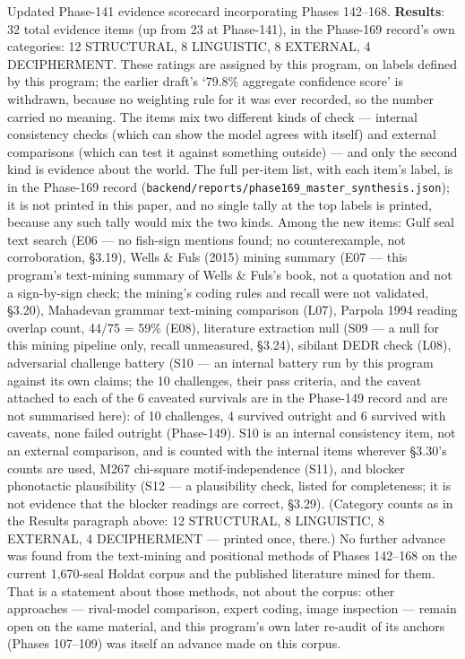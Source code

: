 \documentclass[
]{article}
\newcounter{none} %
\begin{document}
Updated Phase-141 evidence scorecard incorporating Phases 142--168.
\textbf{Results}: 32 total evidence items (up from 23 at Phase-141), in the Phase-169 record's own categories: 12 STRUCTURAL, 8 LINGUISTIC, 8 EXTERNAL, 4 DECIPHERMENT. These ratings are assigned by this program, on labels defined by this program; the earlier draft's `79.8\% aggregate confidence score' is withdrawn, because no weighting rule for it was ever recorded, so the number carried no meaning. The items mix two different kinds of check --- internal consistency checks (which can show the model agrees with itself) and external comparisons (which can test it against something outside) --- and only the second kind is evidence about the world. The full per-item list, with each item's label, is in the Phase-169 record (\texttt{backend/reports/phase169\_master\_synthesis.json}); it is not printed in this paper, and no single tally at the top labels is printed, because any such tally would mix the two kinds. Among the new items: Gulf seal text search (E06 --- no fish-sign mentions found; no counterexample, not corroboration, §3.19), Wells \& Fuls (2015) mining summary (E07 --- this program's text-mining summary of Wells \& Fuls's book, not a quotation and not a sign-by-sign check; the mining's coding rules and recall were not validated, §3.20), Mahadevan grammar text-mining comparison (L07), Parpola 1994 reading overlap count, 44/75 = 59\% (E08), literature extraction null (S09 --- a null for this mining pipeline only, recall unmeasured, §3.24), sibilant DEDR check (L08), adversarial challenge battery (S10 --- an internal battery run by this program against its own claims; the 10 challenges, their pass criteria, and the caveat attached to each of the 6 caveated survivals are in the Phase-149 record and are not summarised here): of 10 challenges, 4 survived outright and 6 survived with caveats, none failed outright (Phase-149). S10 is an internal consistency item, not an external comparison, and is counted with the internal items wherever §3.30's counts are used, M267 chi-square motif-independence (S11), and blocker phonotactic plausibility (S12 --- a plausibility check, listed for completeness; it is not evidence that the blocker readings are correct, §3.29). (Category counts as in the Results paragraph above: 12 STRUCTURAL, 8 LINGUISTIC, 8 EXTERNAL, 4 DECIPHERMENT --- printed once, there.)
No further advance was found from the text-mining and positional methods of Phases 142--168 on the current 1,670-seal Holdat corpus and the published literature mined for them. That is a statement about those methods, not about the corpus: other approaches --- rival-model comparison, expert coding, image inspection --- remain open on the same material, and this program's own later re-audit of its anchors (Phases 107--109) was itself an advance made on this corpus.
\end{document}
